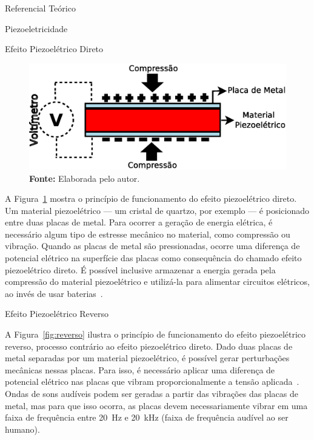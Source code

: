 \begin{chapter}{Referencial Teórico}
\begin{section}{Piezoeletricidade}
\begin{subsection}{Efeito Piezoelétrico Direto}
\begin{figure}[!h]
	\centering
	\begin{minipage}[c]{\textwidth}
	\centering
	\includegraphics[width=0.8\linewidth]{fig/EfeitoPiezoEletricoDireto}
	\caption{Efeito piezoelétrico direto.}
	\vspace{-1cm}
	\caption*{\textbf{Fonte: }Elaborada pelo autor.}
	\label{fig:direto}
	\end{minipage}
\end{figure}

\vspace{-0.5cm}
A Figura~\ref{fig:direto} mostra o princípio de funcionamento do efeito
piezoelétrico direto. Um material piezoelétrico --- um cristal de quartzo, por
exemplo --- é posicionado entre duas placas de metal. Para ocorrer a geração de
energia elétrica, é necessário algum tipo de estresse mecânico no material, como
compressão ou vibração. Quando as placas de metal são pressionadas, ocorre uma
diferença de potencial elétrico na superfície das placas como consequência do
chamado efeito piezoelétrico direto.  É possível inclusive armazenar a
energia gerada pela compressão do material piezoelétrico e utilizá-la para
alimentar circuitos elétricos, ao invés de usar baterias~\cite{twitter}. 

\end{subsection}


\begin{subsection}{Efeito Piezoelétrico Reverso}

A Figura~\ref{fig:reverso} ilustra o princípio de funcionamento do efeito
piezoelétrico reverso, processo contrário ao efeito piezoelétrico direto. Dado
duas placas de metal separadas por um material piezoelétrico, é possível gerar
perturbações mecânicas nessas placas. Para isso, é necessário aplicar uma
diferença de potencial elétrico nas placas que vibram proporcionalmente a tensão
aplicada~\cite{Lin12}. Ondas de sons audíveis podem ser geradas a partir das
vibrações das placas de metal, mas para que isso ocorra, as placas devem
necessariamente vibrar em uma faixa de frequência entre 20~Hz e 20~kHz (faixa de
frequência audível ao ser humano).



\end{subsection}
\end{section}
\end{chapter}

